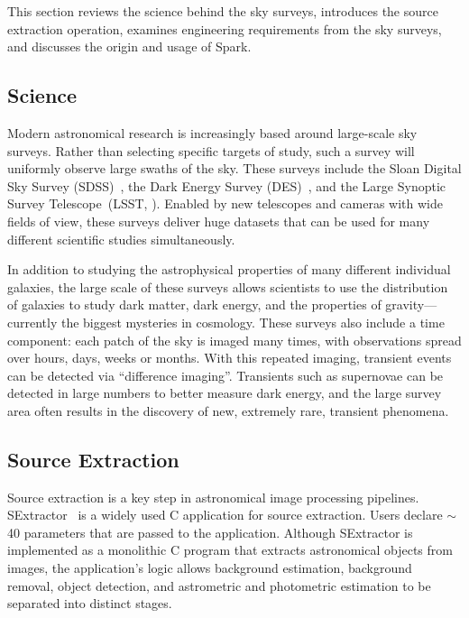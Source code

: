 \documentclass[10pt, conference, compsocconf]{IEEEtran}
\begin{document}
This section reviews the science behind the sky surveys, introduces the source extraction operation, examines engineering requirements from the sky surveys, and discusses the origin and usage of Spark.

\subsection{Science}

Modern astronomical research is increasingly based around large-scale sky surveys.
Rather than selecting specific targets of study, such a survey will uniformly observe large
swaths of the sky. These surveys include the Sloan Digital Sky Survey (SDSS)~\cite{york00},
the Dark Energy Survey (DES)~\cite{dark05}, and the Large Synoptic Survey Telescope~(LSST,
\cite{ivezic08}). Enabled by new telescopes and cameras with wide fields of view, these
surveys deliver huge datasets that can be used for many different scientific studies
simultaneously.

In addition to studying the astrophysical properties of many different individual galaxies,
the large scale of these surveys allows scientists to use the distribution of galaxies to
study dark matter, dark energy, and the properties of gravity---currently the
biggest mysteries in cosmology. These surveys also include a time component: each patch of the sky is imaged many times,
with observations spread over hours, days, weeks or months. With this repeated imaging,
transient events can be detected via ``difference imaging''. Transients such as supernovae
can be detected in large numbers to better measure dark energy, and the large survey area
often results in the discovery of new, extremely rare, transient phenomena.

\subsection{Source Extraction}

Source extraction is a key step in astronomical image processing pipelines.
SExtractor~\cite{bertin96} is a widely used C application for source extraction.
Users declare $\sim$40 parameters that are passed to the application. Although
SExtractor is implemented as a monolithic C program that extracts astronomical
objects from images, the application's logic allows background estimation,
background removal, object detection, and astrometric and photometric estimation
to be separated into distinct stages.
\end{document}
